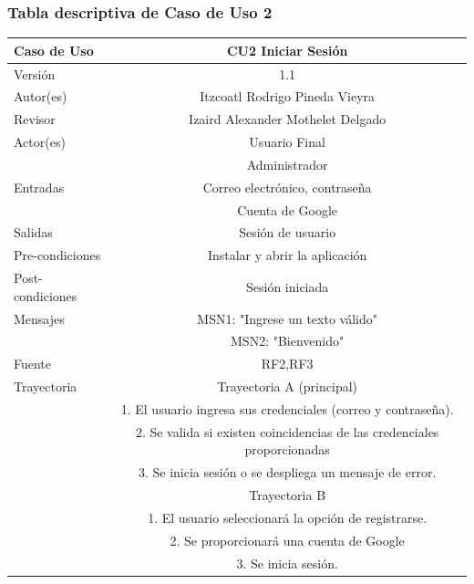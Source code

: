 \documentclass{article}
\begin{document}
\subsubsection{Tabla descriptiva de Caso de Uso 2}
\begin{tabular}{|M{5cm}|c|}
\hline
Caso de Uso & CU2 Iniciar Sesión\\ \hline
Versión & 1.1\\ \hline
Autor(es) & Itzcoatl Rodrigo Pineda Vieyra\\ \hline
Revisor & Izaird Alexander Mothelet Delgado \\ \hline
Actor(es) & Usuario Final \\ & Administrador\\ \hline
Entradas &  Correo electrónico, contraseña\\ & Cuenta de Google \\ \hline
Salidas & Sesión de usuario \\ \hline
Pre-condiciones & Instalar y abrir la aplicación \\ \hline
Post-condiciones & Sesión iniciada\\ \hline
Mensajes & MSN1: "Ingrese un texto válido"\\
		   & MSN2: "Bienvenido"\\ \hline
Fuente & RF2,RF3 \\ \hline	
	Trayectoria & Trayectoria A (principal)\\
		& 1.   El usuario ingresa sus credenciales (correo y contraseña).\\
		& 2.   Se valida si existen coincidencias de las credenciales proporcionadas\\
		& 3. Se inicia sesión o se despliega un mensaje de error.\\
	& Trayectoria B\\
	& 1.   El usuario seleccionará la opción de registrarse.\\
	& 2.   Se proporcionará una cuenta de Google\\
	& 3.   Se inicia sesión.\\ \hline
\end{tabular}
\end{document}
